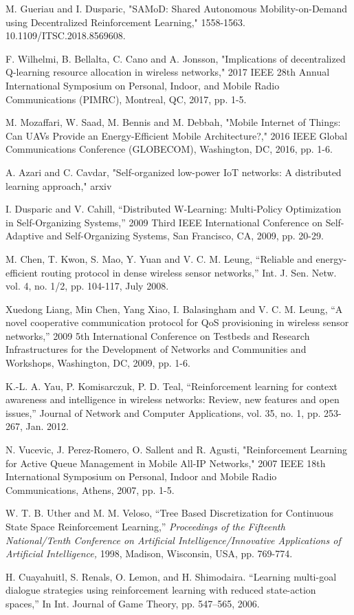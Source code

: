 \documentclass[journal]{IEEEtran}
\begin{document}
\begin{thebibliography}{1}
M. Gueriau and I. Dusparic, "SAMoD: Shared Autonomous Mobility-on-Demand using Decentralized Reinforcement Learning,"  1558-1563. 10.1109/ITSC.2018.8569608.

F. Wilhelmi, B. Bellalta, C. Cano and A. Jonsson, "Implications of decentralized Q-learning resource allocation in wireless networks," 2017 IEEE 28th Annual International Symposium on Personal, Indoor, and Mobile Radio Communications (PIMRC), Montreal, QC, 2017, pp. 1-5.

M. Mozaffari, W. Saad, M. Bennis and M. Debbah, "Mobile Internet of Things: Can UAVs Provide an Energy-Efficient Mobile Architecture?," 2016 IEEE Global Communications Conference (GLOBECOM), Washington, DC, 2016, pp. 1-6.

A. Azari and C. Cavdar, "Self-organized low-power IoT networks: A distributed learning approach," arxiv

I. Dusparic and V. Cahill, ``Distributed W-Learning: Multi-Policy Optimization in Self-Organizing Systems,'' 2009 Third IEEE International Conference on Self-Adaptive and Self-Organizing Systems, San Francisco, CA, 2009, pp. 20-29.


M. Chen, T. Kwon, S. Mao, Y. Yuan and V. C. M. Leung, ``Reliable and energy-efficient routing protocol in dense wireless sensor networks,'' Int. J. Sen. Netw.
 vol. 4, no. 1/2, pp. 104-117, July 2008.


Xuedong Liang, Min Chen, Yang Xiao, I. Balasingham and V. C. M. Leung, ``A novel cooperative communication protocol for QoS provisioning in wireless sensor networks,'' 2009 5th International Conference on Testbeds and Research Infrastructures for the Development of Networks and Communities and Workshops, Washington, DC, 2009, pp. 1-6.

K.-L. A. Yau, P. Komisarczuk, P. D. Teal, ``Reinforcement learning for context awareness and intelligence in wireless
networks: Review, new features and open issues,'' Journal of Network and Computer Applications, vol. 35, no. 1, pp. 253-267, Jan. 2012.

N. Vucevic, J. Perez-Romero, O. Sallent and R. Agusti, "Reinforcement Learning for Active Queue Management in Mobile All-IP Networks," 2007 IEEE 18th International Symposium on Personal, Indoor and Mobile Radio Communications, Athens, 2007, pp. 1-5.

W. T. B. Uther and M. M. Veloso, ``Tree Based Discretization for Continuous State Space Reinforcement Learning,'' \emph{Proceedings of the Fifteenth National/Tenth Conference on Artificial Intelligence/Innovative Applications of Artificial Intelligence,} 1998, Madison, Wisconsin, USA, pp. 769-774.

H. Cuayahuitl, S. Renals, O. Lemon, and H. Shimodaira. ``Learning multi-goal dialogue strategies using reinforcement learning with reduced state-action spaces,'' In Int. Journal of Game Theory, pp. 547–565, 2006.
\end{thebibliography}


\end{document}

